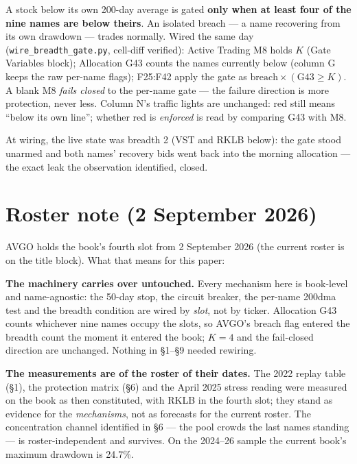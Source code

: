 \documentclass[11pt,a4paper]{article}
\begin{document}
\begin{tcolorbox}[colback=bcgold!8, colframe=bcgold, boxrule=0.8pt,
  title={\bfseries Adopted 26 August 2026 --- the gate becomes breadth-conditional, $K=4$},
  coltitle=bcnavy]
A stock below its own 200-day average is gated \textbf{only when at least four
of the nine names are below theirs}. An isolated breach --- a name recovering
from its own drawdown --- trades normally. Wired the same day
(\texttt{wire\_breadth\_gate.py}, cell-diff verified): Active Trading M8 holds
$K$ (Gate Variables block); Allocation G43 counts the names currently below
(column G keeps the raw per-name flags); F25:F42 apply the gate as
$\text{breach} \times (\text{G43} \ge K)$. A blank M8 \emph{fails closed} to
the per-name gate --- the failure direction is more protection, never less.
Column N's traffic lights are unchanged: red still means ``below its own
line''; whether red is \emph{enforced} is read by comparing G43 with M8.
\end{tcolorbox}

At wiring, the live state was breadth 2 (VST and RKLB below): the gate stood
unarmed and both names' recovery bids went back into the morning allocation ---
the exact leak the observation identified, closed.

\section{Roster note (2 September 2026)}

AVGO holds the book's fourth slot from 2 September 2026 (the current roster
is on the title block). What that means for this paper:

\textbf{The machinery carries over untouched.} Every mechanism here is
book-level and name-agnostic: the 50-day stop, the circuit breaker, the
per-name 200dma test and the breadth condition are wired by \emph{slot}, not
by ticker. Allocation G43 counts whichever nine names occupy the slots, so
AVGO's breach flag entered the breadth count the moment it entered the book;
$K{=}4$ and the fail-closed direction are unchanged. Nothing in \S1--\S9
needed rewiring.

\textbf{The measurements are of the roster of their dates.} The 2022 replay
table (\S1), the protection matrix (\S6) and the April 2025 stress reading
were measured on the book as then constituted, with RKLB in the fourth slot;
they stand as evidence for the \emph{mechanisms}, not as forecasts for the
current roster. The concentration channel identified in \S6 --- the pool
crowds the last names standing --- is roster-independent and survives. On the
2024--26 sample the current book's maximum drawdown is 24.7\%.
\end{document}
